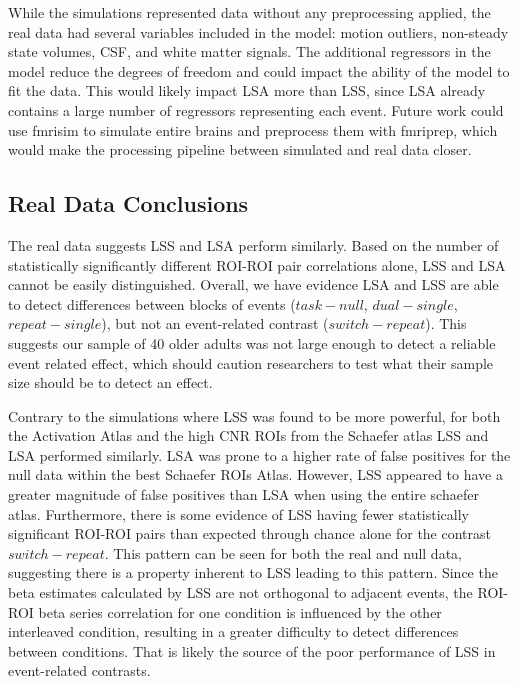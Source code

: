 \documentclass[10pt,letterpaper]{article}
\begin{document}
While the simulations represented data without any preprocessing applied,
the real data had several variables included in the model: motion outliers, non-steady state volumes,
CSF, and white matter signals.
The additional regressors in the model reduce the degrees of freedom
and could impact the ability of the model to fit the data.
This would likely impact LSA more than LSS, since LSA already contains
a large number of regressors representing each event.
Future work could use fmrisim to simulate entire brains and preprocess them with fmriprep,
which would make the processing pipeline between simulated and real data closer.

\subsection*{Real Data Conclusions}
\label{discussion:taskswitching-conclusions}

The real data suggests LSS and LSA perform similarly.
Based on the number of statistically significantly different ROI-ROI pair correlations alone,
LSS and LSA cannot be easily distinguished.
Overall, we have evidence LSA and LSS are able to detect differences between
blocks of events ($task - null$, $dual - single$, $repeat - single$), but not an event-related contrast ($switch - repeat$).
This suggests our sample of 40 older adults was not large enough to detect a reliable event related effect,
which should caution researchers to test what their sample size should be to detect an effect.

Contrary to the simulations where LSS was found to be more powerful,
for both the Activation Atlas and the high CNR ROIs from the Schaefer atlas LSS and LSA performed similarly.
LSA was prone to a higher rate of false positives for the null data within the best Schaefer ROIs Atlas.
However, LSS appeared to have a greater magnitude of false positives than LSA when using the entire schaefer atlas.
Furthermore, there is some evidence of LSS having fewer statistically significant ROI-ROI pairs than expected through chance alone
for the contrast $switch - repeat$.
This pattern can be seen for both the real and null data, suggesting there is a property inherent to LSS
leading to this pattern.
Since the beta estimates calculated by LSS are not orthogonal to adjacent events,
the ROI-ROI beta series correlation for one condition is influenced by the other interleaved condition,
resulting in a greater difficulty to detect differences between conditions.
That is likely the source of the poor performance of LSS in event-related contrasts.
\end{document}
